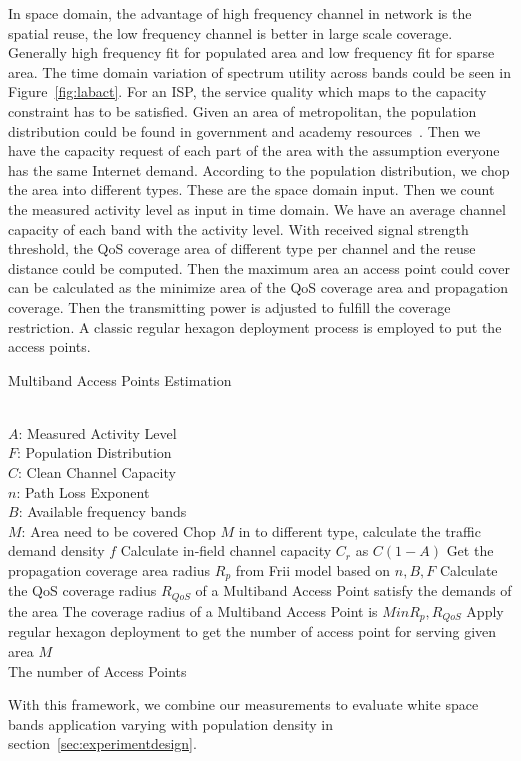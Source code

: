 In space domain, the advantage of high frequency channel in network is the spatial reuse, the low
frequency channel is better in large scale coverage. Generally high frequency fit
for populated area and low frequency fit for sparse area.
The time domain variation of spectrum utility across bands could be seen in Figure~\ref{fig:labact}.
For an ISP, the service quality which maps to the capacity constraint has to be satisfied.
Given an area of metropolitan, the population distribution could be found in 
government and academy resources~\cite{uscensus}. Then we have the capacity request
of each part of the area with the assumption everyone has the same Internet demand. 
According to the population distribution, we chop the area into different types.
These are the space domain input. Then we count the measured activity level as 
input in time domain. We have an average channel capacity of each band with the 
activity level. With received signal strength threshold, 
the QoS coverage area of different type per channel and the reuse distance could be computed. 
Then the maximum area an access point could cover can be calculated as the minimize 
area of the QoS coverage area and propagation coverage.
Then the transmitting power is adjusted to fulfill the coverage restriction. 
A classic regular hexagon deployment process is employed to put the access points.

\begin{algorithm}[t]
    \small
\caption{Multiband Access Points Estimation}
\label{algorithm:mape}
\begin{algorithmic}[1]
\REQUIRE  ~~\\
	$A$: Measured Activity Level \\
	$F$: Population Distribution\\
	$C$: Clean Channel Capacity\\
	$n$: Path Loss Exponent \\
	$B$: Available frequency bands\\
	$M$: Area need to be covered
\STATE Chop $M$ in to different type, calculate the traffic demand density $f$
\STATE Calculate in-field channel capacity $C_r$ as $C(1-A)$  
\STATE Get the propagation coverage area radius $R_p$ from Frii model based on $n,B,F$
\STATE Calculate the QoS coverage radius $R_{QoS}$ of a Multiband Access Point satisfy the demands of the area
\STATE The coverage radius of a Multiband Access Point is $Min{R_p,R_{QoS}}$
\STATE Apply regular hexagon deployment to get the number of access point for serving given area $M$ 
\ENSURE ~~\\    
 The number of Access Points\\
\end{algorithmic}
\end{algorithm}

With this framework, we combine our measurements to evaluate white
space bands application varying with population density in section~\ref{sec:experimentdesign}.



